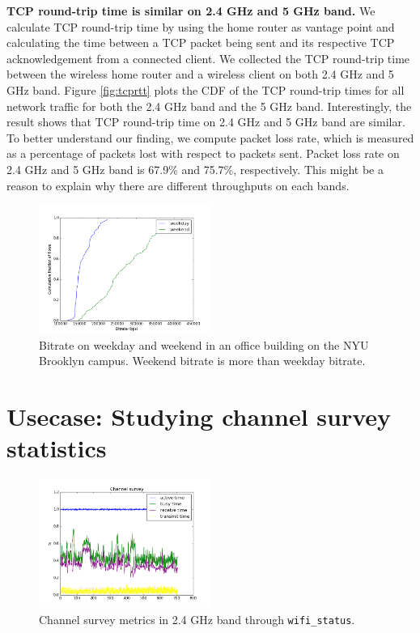 \textbf{TCP round-trip time is similar on 2.4 GHz and 5 GHz band.} We calculate TCP round-trip time by using the home router as vantage point and calculating the time between a TCP packet being sent and its respective TCP acknowledgement from a connected client. We collected the TCP round-trip time between the wireless home router and a wireless client on both 2.4 GHz and 5 GHz band. Figure \ref{fig:tcprtt} plots the CDF of the TCP round-trip times for all network traffic for both the 2.4 GHz band and the 5 GHz band. Interestingly, the result shows that TCP round-trip time on 2.4 GHz and 5 GHz band are similar. To better understand our finding, we compute packet loss rate, which is measured as a percentage of packets lost with respect to packets sent. Packet loss rate on 2.4 GHz and 5 GHz band is 67.9\% and 75.7\%, respectively. This might be a reason to explain why there are different throughputs on each bands.  

\begin{figure}
\centering
\includegraphics[width=0.5\textwidth]{figure/bitrate(weekday_vs_weekend).png}
\caption{Bitrate on weekday and weekend in an office building on the NYU Brooklyn campus. Weekend bitrate is more than weekday bitrate.} 
\label{fig:compare}
\end{figure}  

\section{Usecase: Studying channel survey statistics}
\label{sec.usecase2}

\begin{figure}
\centering
\includegraphics[width=0.5\textwidth]{figure/channel.png}
\caption{Channel survey metrics in 2.4 GHz band through \texttt{wifi\_status}.} 
\label{fig:channelsurvey}
\end{figure}

